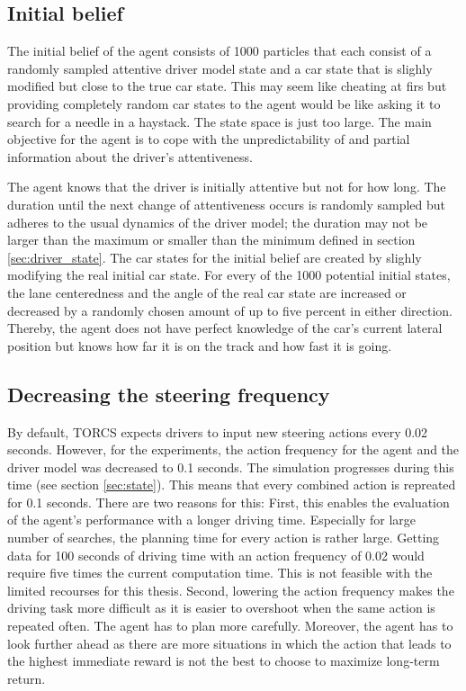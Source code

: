 \subsection{Initial belief}

The initial belief of the agent consists of 1000 particles that each consist of a randomly sampled attentive driver model state and a car state that is slighly modified but close to the true car state. This may seem like cheating at firs but providing completely random car states to the agent would be like asking it to search for a needle in a haystack. The state space is just too large. The main objective for the agent is to cope with the unpredictability of and partial information about the driver's attentiveness.

The agent knows that the driver is initially attentive but not for how long. The duration until the next change of attentiveness occurs is randomly sampled but adheres to the usual dynamics of the driver model; the duration may not be larger than the maximum or smaller than the minimum defined in section \ref{sec:driver_state}. The car states for the initial belief are created by slighly modifying the real initial car state. For every of the 1000 potential initial states, the lane centeredness and the angle of the real car state are increased or decreased by a randomly chosen amount of up to five percent in either direction. Thereby, the agent does not have perfect knowledge of the car's current lateral position but knows how far it is on the track and how fast it is going.

\subsection{Decreasing the steering frequency}

By default, TORCS expects drivers to input new steering actions every 0.02 seconds. However, for the experiments, the action frequency for the agent and the driver model was decreased to 0.1 seconds. The simulation progresses during this time (see section \ref{sec:state}). This means that every combined action is repreated for 0.1 seconds. There are two reasons for this: First, this enables the evaluation of the agent's performance with a longer driving time. Especially for large number of searches, the planning time for every action is rather large. Getting data for 100 seconds of driving time with an action frequency of 0.02 would require five times the current computation time. This is not feasible with the limited recourses for this thesis. Second, lowering the action frequency makes the driving task more difficult as it is easier to overshoot when the same action is repeated often. The agent has to plan more carefully.  Moreover, the agent has to look further ahead as there are more situations in which the action that leads to the highest immediate reward is not the best to choose to maximize long-term return.

